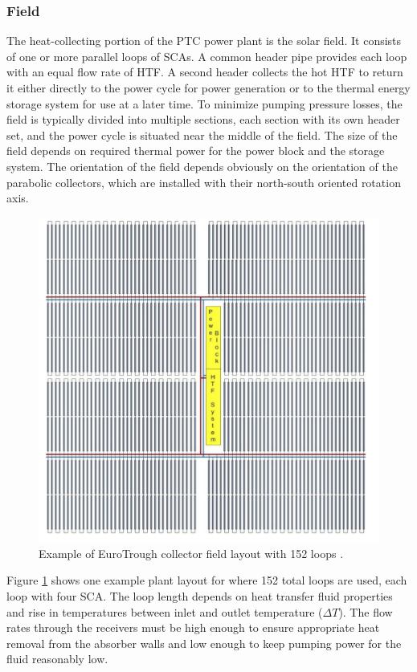 \documentclass[Master,MEE,english]{twbook}%
\begin{document}
\subsubsection{Field}
The heat-collecting portion of the PTC power plant is the solar field. It consists of one or more parallel loops of SCAs. A common header pipe provides each loop with an equal flow rate of HTF. A second header collects the hot HTF to return it either directly to the power cycle for power generation or to the thermal energy storage system for use at a later time. To minimize pumping pressure losses, the field is typically divided into multiple sections, each section with its own header set, and the power cycle is situated near the middle of the field. The size of the field depends on required thermal power for the power block and the storage system. The orientation of the field depends obviously on the orientation of the parabolic collectors, which are installed with their north-south oriented rotation axis.
\begin{figure}[!h] 
\centering
\includegraphics[width=0.7\linewidth]{FIG/PTC_field_EuroTrough}
\caption[Example of a EuroTrough collector field layout with 152 loops.]{Example of EuroTrough collector field layout with 152 loops \cite{VonReeken2014}.}\label{PTC_field_EuroTrough}
\end{figure}
Figure \ref{PTC_field_EuroTrough} shows one example plant layout for where  152 total loops are used, each loop with four SCA. The loop length depends on heat transfer fluid properties and rise in temperatures between inlet and outlet temperature ($\Delta T$). The flow rates through the receivers must be high enough to ensure appropriate heat removal from the absorber walls and low enough to keep pumping power for the fluid reasonably low.
\pagebreak
\end{document}
